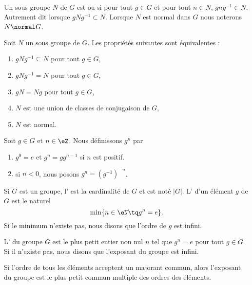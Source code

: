 \begin{definition}
    Un sous groupe \( N\) de \( G\) est  ou  si pour tout \( g\in G\) et pour tout \( n\in N\), \( gng^{-1}\in N\). Autrement dit lorsque \( gNg^{-1}\subset N\). Lorsque \( N\) est normal dans \( G\) nous noterons \( N\normal G\).
\end{definition}

\begin{proposition}
    Soit \( N\) un sous groupe de \( G\). Les propriétés suivantes sont équivalentes :
    \begin{enumerate}
        \item
            \( gNg^{-1}\subseteq N\) pour tout \( g\in G\),
        \item
            \( gNg^{-1}= N\) pour tout \( g\in G\),
        \item
            \( gN=Ng\) pour tout \( g\in G\),
        \item
            \( N\) est une union de classes de conjugaison de \( G\),
        \item
            \( N\) est normal.
    \end{enumerate}
\end{proposition}

\begin{definition}
    Soit \( g\in G\) et \( n\in \eZ\). Nous définissons \( g^n\) par
    \begin{enumerate}
        \item
            \( g^0=e\) et \( g^n=gg^{n-1}\) si \( n\) est positif.
        \item
            si \( n<0\), nous posons \( g^n=(g^{-1})^{-n}\).
    \end{enumerate}
\end{definition}

\begin{definition}
    Si \( G\) est un groupe, l' est la cardinalité de \( G\) et est noté \( | G |\). L' d'un élément \( g\) de \( G\) est le naturel
    \begin{equation}
        \min\{ n\in\eN\tq g^n=e \}.
    \end{equation}
    Si le minimum n'existe pas, nous disons que l'ordre de \( g\) est infini.
\end{definition}

\begin{definition}
    L' du groupe \( G\) est le plus petit entier non nul \( n\) tel que \( g^n=e\) pour tout \( g\in G\). Si il n'existe pas, nous disons que l'exposant du groupe est infini.
\end{definition}
Si l'ordre de tous les éléments acceptent un majorant commun, alors l'exposant du groupe est le plus petit commun multiple des ordres des éléments.

